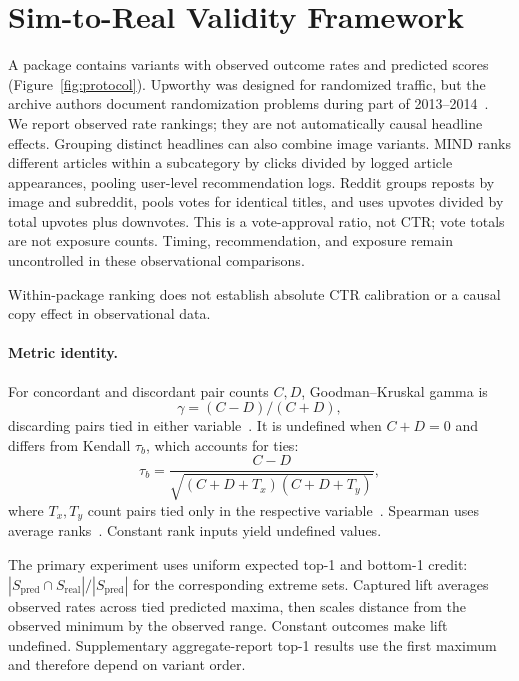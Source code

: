 \section{Sim-to-Real Validity Framework}
A package contains variants with observed outcome rates and predicted scores
(Figure~\ref{fig:protocol}). Upworthy was designed for randomized traffic, but the archive authors document randomization
problems during part of 2013--2014~\citep{matias2024correction}. We report observed rate rankings;
they are not automatically causal headline effects. Grouping distinct headlines can also combine
image variants. MIND ranks different articles within a subcategory by clicks divided by logged
article appearances, pooling user-level recommendation logs. Reddit groups reposts by image and
subreddit, pools votes for identical titles, and uses upvotes divided by total upvotes plus
downvotes. This is a vote-approval ratio, not CTR; vote totals are not exposure counts. Timing,
recommendation, and exposure remain uncontrolled in these observational comparisons.

Within-package ranking does not establish absolute CTR calibration or a causal copy effect
in observational data.

\paragraph{Metric identity.}
For concordant and discordant pair counts $C,D$, Goodman--Kruskal gamma is
\[
\gamma=(C-D)/(C+D),
\]
discarding pairs tied in either variable~\citep{goodman1954}. It is undefined when $C+D=0$ and
differs from Kendall $\tau_b$, which accounts for ties:
\[
\tau_b=\frac{C-D}{\sqrt{(C+D+T_x)(C+D+T_y)}},
\]
where $T_x,T_y$ count pairs tied only in the respective variable~\citep{kendall1945ties}.
Spearman uses average ranks~\citep{spearman1904}. Constant rank inputs yield undefined values.

The primary experiment uses uniform expected top-1 and bottom-1 credit:
$|S_{\mathrm{pred}}\cap S_{\mathrm{real}}|/|S_{\mathrm{pred}}|$ for the corresponding extreme
sets. Captured lift averages observed rates across tied predicted maxima, then scales distance
from the observed minimum by the observed range. Constant outcomes make lift undefined.
Supplementary aggregate-report top-1 results use the first maximum and therefore depend on variant order.
